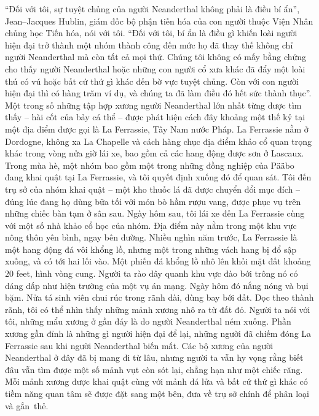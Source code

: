 \begin{multicols}{2}
\begin{figure}[H]
		\vspace*{-10pt}
	\end{figure}
	“Đối với tôi, sự tuyệt chủng của người Neanderthal không phải là điều bí ẩn”, Jean--Jacques Hublin, giám đốc bộ phận tiến hóa của con người thuộc Viện Nhân chủng học Tiến hóa, nói với tôi. “Đối với tôi, bí ẩn là điều gì khiến loài người hiện đại trở thành một nhóm thành công đến mức họ đã thay thế không chỉ người Neanderthal mà còn tất cả mọi thứ. Chúng tôi không có mấy bằng chứng cho thấy người Neanderthal hoặc những con người cổ xưa khác đã đẩy một loài thú có vú hoặc bất cứ thứ gì khác đến bờ vực tuyệt chủng. Còn với con người hiện đại thì có hàng trăm ví dụ, và chúng ta đã làm điều đó hết sức thành thục”.
	\vskip 0.1cm
	Một trong số những tập hợp xương người Neanderthal lớn nhất từng được tìm thấy -- hài cốt của bảy cá thể -- được phát hiện cách đây khoảng một thế kỷ tại một địa điểm được gọi là La Ferrassie, Tây Nam nước Pháp. La Ferrassie nằm ở Dordogne, không xa La Chapelle và cách hàng chục địa điểm khảo cổ quan trọng khác trong vòng nửa giờ lái xe, bao gồm cả các hang động được sơn ở Lascaux. Trong mùa hè, một nhóm bao gồm một trong những đồng nghiệp của Pääbo đang khai quật tại La Ferrassie, và tôi quyết định xuống đó để quan sát. Tôi đến trụ sở của nhóm khai quật -- một kho thuốc lá đã được chuyển đổi mục đích -- đúng lúc đang họ dùng bữa tối với món bò hầm rượu vang, được phục vụ trên những chiếc bàn tạm ở sân sau.
	\vskip 0.1cm
	Ngày hôm sau, tôi lái xe đến La Ferrassie cùng với một số nhà khảo cổ học của nhóm. Địa điểm này nằm trong một khu vực nông thôn yên bình, ngay bên đường. Nhiều nghìn năm trước, La Ferrassie là một hang động đá vôi khổng lồ, nhưng một trong những vách hang bị đổ sập xuống, và có tới hai lối vào. Một phiến đá khổng lồ nhô lên khỏi mặt đất khoảng $20$ feet, hình vòng cung. Người ta rào dây quanh khu vực đào bới trông nó có dáng dấp như hiện trường của một vụ án mạng.
	\vskip 0.1cm
	Ngày hôm đó nắng nóng và bụi bặm. Nửa tá sinh viên chui rúc trong rãnh dài, dùng bay bới đất. Dọc theo thành rãnh, tôi có thể nhìn thấy những mảnh xương nhô ra từ đất đỏ. Người ta nói với tôi, những mẩu xương ở gần đáy là do người Neanderthal ném xuống. Phần xương gần đỉnh là những gì người hiện đại để lại, những người đã chiếm đóng La Ferrassie sau khi người Neanderthal biến mất. Các bộ xương của người Neanderthal ở đây đã bị mang đi từ lâu, nhưng người ta vẫn hy vọng rằng biết đâu vẫn tìm được một số mảnh vụt còn sót lại, chẳng hạn như một chiếc răng. Mỗi mảnh xương được khai quật cùng với mảnh đá lửa và bất cứ thứ gì khác có tiềm năng quan tâm sẽ được đặt sang một bên, đưa về trụ sở chính để phân loại và gắn~thẻ.

\end{multicols}
